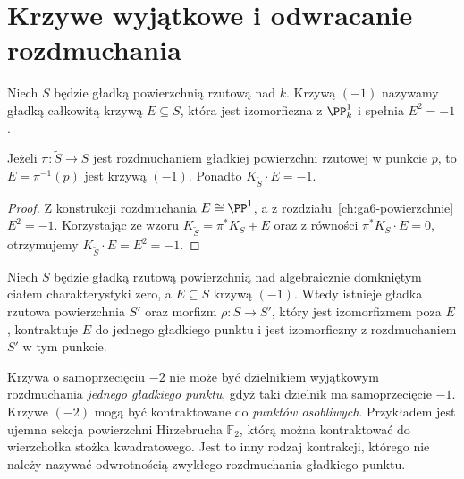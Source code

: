 \section{Krzywe wyjątkowe i odwracanie rozdmuchania}
\label{sec:ga8-contraction}

\begin{definicja}[Krzywa $(-1)$]
\label{def:ga8-minus-one}
Niech $S$ będzie gładką powierzchnią rzutową nad $k$.
Krzywą $(-1)$ nazywamy gładką całkowitą krzywą
$E\subseteq S$, która jest izomorficzna z $\PP^1_k$
i spełnia $E^2=-1$.
\end{definicja}

\begin{stwierdzenie}
\label{st:ga8-exceptional-curve}
Jeżeli $\pi:\widetilde S\to S$ jest rozdmuchaniem
gładkiej powierzchni rzutowej w punkcie $p$, to
$E=\pi^{-1}(p)$ jest krzywą $(-1)$.
Ponadto $K_{\widetilde S}\cdot E=-1$.
\end{stwierdzenie}
\begin{proof}
Z konstrukcji rozdmuchania $E\cong\PP^1$, a z
rozdziału~\ref{ch:ga6-powierzchnie} $E^2=-1$.
Korzystając ze wzoru $K_{\widetilde S}=\pi^*K_S+E$
oraz z równości $\pi^*K_S\cdot E=0$, otrzymujemy
$K_{\widetilde S}\cdot E=E^2=-1$.
\end{proof}

\begin{twierdzenie}
\label{tw:ga8-castelnuovo}
Niech $S$ będzie gładką rzutową powierzchnią nad
algebraicznie domkniętym ciałem charakterystyki zero,
a $E\subseteq S$ krzywą $(-1)$. Wtedy istnieje
gładka rzutowa powierzchnia $S'$ oraz morfizm
$\rho:S\to S'$, który jest izomorfizmem poza $E$,
kontraktuje $E$ do jednego gładkiego punktu i jest
izomorficzny z rozdmuchaniem $S'$ w tym punkcie.
\end{twierdzenie}

\begin{uwaga}
Krzywa o samoprzecięciu $-2$ nie może być dzielnikiem
wyjątkowym rozdmuchania \emph{jednego gładkiego punktu},
gdyż taki dzielnik ma samoprzecięcie $-1$.
Krzywe $(-2)$ mogą być kontraktowane do \emph{punktów osobliwych}.
Przykładem jest ujemna sekcja powierzchni Hirzebrucha
$\mathbb F_2$, którą można kontraktować do wierzchołka
stożka kwadratowego. Jest to inny rodzaj kontrakcji,
którego nie należy nazywać odwrotnością zwykłego
rozdmuchania gładkiego punktu.
\end{uwaga}

